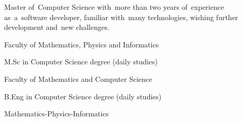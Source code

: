 \documentclass[11pt,a4paper]{article}
\begin{document}
    \bigskip


    \smallskip

    \noindent
    Master of~Computer Science with~more than two years of~experience as~a~software developer, familiar with~many technologies, wishing further development and~new challenges.

  
    \vspace{0.5cm}
  
    \medskip
    \vspace{-1.6mm}
    \begin{description} \itemsep0pt \parskip0pt 
        \item[ ] Faculty of Mathematics, Physics and Informatics
        \item[ ] M.Sc in Computer Science degree (daily studies)
    \end{description}
  
    \vspace{-1.6mm}
    \begin{description} \itemsep0pt \parskip0pt 
        \item[ ] Faculty of Mathematics and Computer Science
        \item[ ] B.Eng in Computer Science degree (daily studies)
    \end{description}
  
    \vspace{-1.6mm}
    \begin{description} \itemsep0pt \parskip0pt 
        \item[ ] Mathematics-Physics-Informatics
    \end{description}
  
  
    \vspace{0.3cm}
  
  
\end{document}
